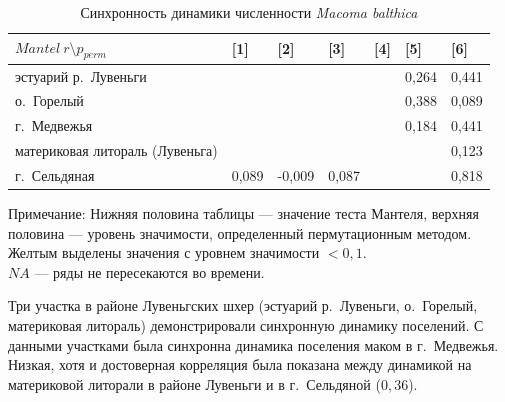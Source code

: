 	\begin{table}[p]
	\caption{Синхронность динамики численности {\it Macoma balthica}}
	\label{tab:Mantel_dynamic_N}
        \begin{tabularx}{\textwidth}{|p{}|*{6}{X|}} \hline
	$Mantel \ r \setminus p_{perm}$ & [1] & [2] & [3] & [4] & [5] & [6]   \\ \hline
            [1] эстуарий р.~Лувеньги            &         & \cellcolor{yellow}{ 0,002 }   & \cellcolor{yellow}{ 0,009 }     & \cellcolor{yellow}{ 0,001 }   &  0,264       &  0,441  \\ \hline
            [2] о.~Горелый              & \cellcolor{yellow}{ 0,929 }   &         & \cellcolor{yellow}{ 0,014 }     & \cellcolor{yellow}{ 0,001 }   &  0,388       &  0,089  \\ \hline
            [3] г.~Медвежья             & \cellcolor{yellow}{ 0,821 }   & \cellcolor{yellow}{ 0,86 }    &           & \cellcolor{yellow}{ 0,001 }   &  0,184       &  0,441  \\ \hline
            [4] материковая литораль (Лувеньга) & \cellcolor{yellow}{ 0,781 }   & \cellcolor{yellow}{ 0,784 }   & \cellcolor{yellow}{ 0,704 }     &         & \cellcolor{yellow}{ 0,044 }      &  0,123  \\ \hline
            [5] г.~Сельдяная            &  0,089    &  -0,009   &  0,087      & \cellcolor{yellow}{ 0,364 }   &            &  0,818  \\ \hline
	\end{tabularx}
	   {\footnotesize Примечание: Нижняя половина таблицы --- значение теста Мантеля, верхняя половина --- уровень значимости, определенный пермутационным методом. \\
Желтым выделены значения с уровнем значимости $< 0,1$. \\
$NA$ --- ряды не пересекаются во времени.}
	\end{table}
Три участка в районе Лувеньгских шхер (эстуарий р.~Лувеньги, о.~Горелый, материковая литораль) демонстрировали синхронную динамику поселений.
С данными участками была синхронна динамика поселения маком в г.~Медвежья. 
Низкая, хотя и достоверная корреляция была показана между динамикой на материковой литорали в районе Лувеньги и в г.~Сельдяной ($0,36$).


